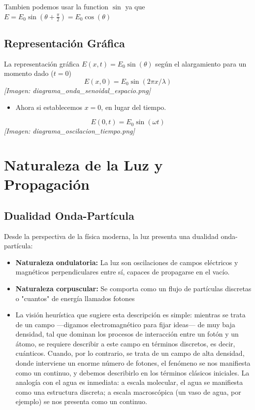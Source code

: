 \documentclass[12pt]{article}
\begin{document}
	Tambien podemos usar la function $\sin$ ya que $E = E_0 \sin(\theta + \frac{\pi}{2}) = E_0 \cos(\theta)$
	
	\subsection{Representación Gráfica}
	La representación gráfica $E(x,t) = E_0 \sin(\theta)$ según el alargamiento para un momento dado ($t=0$)
	\begin{equation*}
		E(x,0) = E_0 \sin(2\pi x / \lambda)
	\end{equation*}
	\textit{[Imagen: diagrama\_onda\_senoidal\_espacio.png]}
	
	\begin{itemize}
		\item Ahora si establecemos $x=0$, en lugar del tiempo.
	\end{itemize}
	\begin{equation*}
		E(0,t) = E_0 \sin(\omega t)
	\end{equation*}
	\textit{[Imagen: diagrama\_oscilacion\_tiempo.png]}
	
	\section{Naturaleza de la Luz y Propagación}
	
	\subsection{Dualidad Onda-Partícula}
	Desde la perspectiva de la física moderna, la luz presenta una dualidad onda-partícula:
	\begin{itemize}
		\item \textbf{Naturaleza ondulatoria:} La luz son oscilaciones de campos eléctricos y magnéticos perpendiculares entre sí, capaces de propagarse en el vacío.
		\item \textbf{Naturaleza corpuscular:} Se comporta como un flujo de partículas discretas o "cuantos" de energía llamados fotones
		\item La visión heurística que sugiere esta descripción es simple: mientras se trata de un campo —digamos electromagnético para fijar ideas— de muy baja densidad, tal que dominan los procesos de interacción entre un fotón y un átomo, se requiere describir a este campo en términos discretos, es decir, cuánticos. Cuando, por lo contrario, se trata de un campo de alta densidad, donde interviene un enorme número de fotones, el fenómeno se nos manifiesta como un continuo, y debemos describirlo en los términos clásicos iniciales. La analogía con el agua es inmediata: a escala molecular, el agua se manifiesta como una estructura discreta; a escala macroscópica (un vaso de agua, por ejemplo) se nos presenta como un continuo.
	\end{itemize}
	
\end{document}
